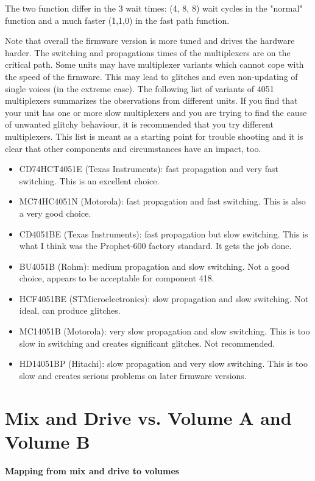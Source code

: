\documentclass[portrait, 11pt, oneside]{report}
\begin{document}
The two function differ in the 3 wait times: (4, 8, 8) wait cycles in the "normal" function and a much faster (1,1,0) in the fast path function.

Note that overall the firmware version \version is more tuned and drives the hardware harder. The switching and propagations times of the multiplexers are on the critical path. Some units may have multiplexer variants which cannot cope with the speed of the firmware. This may lead to glitches and even non-updating of single voices (in the extreme case). The following list of variants of 4051 multiplexers summarizes the observations from different units. If you find that your unit has one or more slow multiplexers and you are trying to find the cause of unwanted glitchy behaviour, it is recommended that you try different multiplexers. This list is meant as a starting point for trouble shooting and it is clear that other components and circumstances have an impact, too.

\begin{itemize}
  \item CD74HCT4051E (Texas Instruments): fast propagation and very fast switching. This is an excellent choice. 
  \item MC74HC4051N (Motorola): fast propagation and fast switching. This is also a very good choice.
  \item CD4051BE (Texas Instruments): fast propagation but slow switching. This is what I think was the Prophet-600 factory standard. It gets the job done.  
  \item BU4051B (Rohm): medium propagation and slow switching. Not a good choice, appears to be acceptable for component 418.
  \item HCF4051BE (STMicroelectronics): slow propagation and slow switching. Not ideal, can produce glitches.
  \item MC14051B (Motorola): very slow propagation and slow switching. This is too slow in switching and creates significant glitches. Not recommended.
  \item HD14051BP (Hitachi): slow propagation and very slow switching. This is too slow and creates serious problems on later firmware versions.
\end{itemize}


\section{Mix and Drive vs. Volume A and Volume B}

\textbf{Mapping from mix and drive to volumes} 
\end{document}
